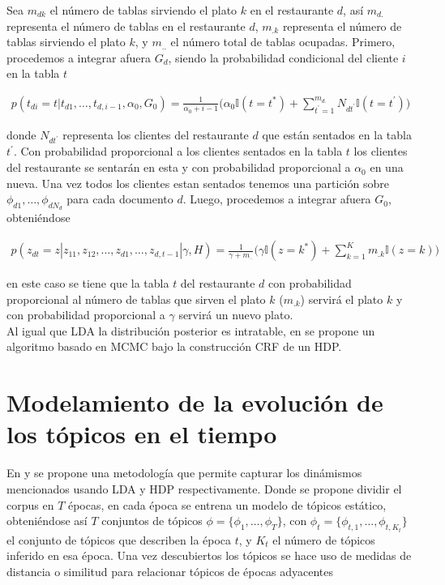 Sea $m_{dk}$ el número de tablas sirviendo el plato $k$ en el restaurante $d$, así $m_{d.}$ representa el número de tablas en el restaurante $d$, $m_{.k}$ representa el número de tablas sirviendo el plato $k$, y $m_{..}$ el número total de tablas ocupadas. Primero, procedemos a integrar afuera $G_{d}$, siendo la probabilidad condicional del cliente $i$ en la tabla $t$

\begin{align}
p(t_{di}=t|t_{d1}, \ldots, t_{d,i-1}, \alpha_{0}, G_{0}) = \frac{1}{\alpha_{0}+i-1}\bigg(\alpha_{0}\mathbb{I}(t=t^{*})+\sum_{t^{'}=1}^{m_{d.}}N_{dt^{'}}\mathbb{I}(t=t^{'})\bigg)
\end{align}

donde $N_{dt^{'}}$ representa los clientes del restaurante $d$ que están sentados en la tabla $t^{'}$. Con probabilidad proporcional a los clientes sentados en la tabla $t$ los clientes del restaurante se sentarán en esta y con probabilidad proporcional a $\alpha_{0}$ en una nueva. Una vez todos los clientes estan sentados tenemos una partición sobre $\phi_{d1}, \ldots, \phi_{dN_{d}}$ para cada documento $d$. Luego, procedemos a integrar afuera $G_{0}$, obteniéndose

\begin{align}
    p(z_{dt}=z|z_{11}, z_{12}, \ldots, z_{d1}, \ldots, z_{d, t-1}|\gamma, H) = \frac{1}{\gamma+m_{..}}\bigg(\gamma\mathbb{I}(z=k^{*})+\sum_{k=1}^{K}m_{.k}\mathbb{I}(z=k)\bigg)
\end{align}

en este caso se tiene que la tabla $t$ del restaurante $d$ con probabilidad proporcional al número de tablas que sirven el plato $k$ ($m_{.k}$) servirá el plato $k$ y con probabilidad proporcional a $\gamma$ servirá un nuevo plato.\\

Al igual que LDA la distribución posterior es intratable, en  \citep{teh2005sharing} se propone un algoritmo basado en MCMC bajo la construcción CRF de un HDP. 

\section{Modelamiento de la evolución de los tópicos en el tiempo}
\label{sec:topic_evolution} 

En \citep{wilson2011tracking} y \citep{beykikhoshk2018discovering} se propone una metodología que permite capturar los dinámismos mencionados usando LDA y HDP respectivamente. Donde se propone dividir el corpus en $T$ épocas, en cada época se entrena un modelo de tópicos estático, obteniéndose así $T$ conjuntos de tópicos $\phi=\{\phi_{1}, \ldots, \phi_{T}\}$, con $\phi_{t}=\{\phi_{t,1}, \ldots, \phi_{t,K_{t}}\}$ el conjunto de tópicos que describen la época $t$, y $K_{t}$ el número de tópicos inferido en esa época. Una vez descubiertos los tópicos se hace uso de medidas de distancia o similitud para relacionar tópicos de épocas adyacentes \\

